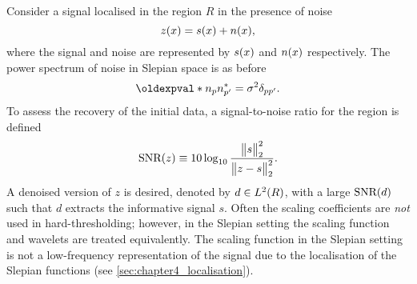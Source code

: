 Consider a signal localised in the region \(R\) in the presence of noise
%
\begin{equation}\label{eq:chapter4_noised_signal}
	z(x)
	= s(x) + n(x),
\end{equation}
%
where the signal and noise are represented by \(s(x)\) and \(n(x)\) respectively.
The power spectrum of noise in Slepian space is as before
%
\begin{equation}
	\expval{\slepian{n} \conj{\slepian[']{n}}}
	= \sigma^{2} \delta_{pp'}.
\end{equation}
%
To assess the recovery of the initial data, a signal-to-noise ratio for the region is defined
%
\begin{equation}
	\text{SNR}(z)
	\equiv 10 \log_{10} \frac{{\big\lVert s\big\rVert}_{2}^{2}}{{\big\lVert z - s\big\rVert}_{2}^{2}}.
\end{equation}
%
A denoised version of \(z\) is desired, denoted by \(d \in L^{2}(R)\), with a large \(\text{SNR}(d)\) such that \(d\) extracts the informative signal \(s\).
Often the scaling coefficients are \emph{not} used in hard-thresholding; however, in the Slepian setting the scaling function and wavelets are treated equivalently.
The scaling function in the Slepian setting is not a low-frequency representation of the signal due to the localisation of the Slepian functions (see \cref{sec:chapter4_localisation}).

